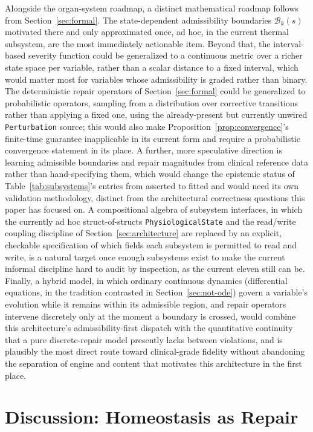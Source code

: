 \documentclass[11pt]{article}
\begin{document}
Alongside the organ-system roadmap, a distinct mathematical roadmap follows from Section~\ref{sec:formal}. The state-dependent admissibility boundaries $\mathcal B_k(s)$ motivated there and only approximated once, ad hoc, in the current thermal subsystem, are the most immediately actionable item. Beyond that, the interval-based severity function could be generalized to a continuous metric over a richer state space per variable, rather than a scalar distance to a fixed interval, which would matter most for variables whose admissibility is graded rather than binary. The deterministic repair operators of Section~\ref{sec:formal} could be generalized to probabilistic operators, sampling from a distribution over corrective transitions rather than applying a fixed one, using the already-present but currently unwired \texttt{Perturbation} source; this would also make Proposition~\ref{prop:convergence}'s finite-time guarantee inapplicable in its current form and require a probabilistic convergence statement in its place. A further, more speculative direction is learning admissible boundaries and repair magnitudes from clinical reference data rather than hand-specifying them, which would change the epistemic status of Table~\ref{tab:subsystems}'s entries from asserted to fitted and would need its own validation methodology, distinct from the architectural correctness questions this paper has focused on. A compositional algebra of subsystem interfaces, in which the currently ad hoc struct-of-structs \texttt{PhysiologicalState} and the read/write coupling discipline of Section~\ref{sec:architecture} are replaced by an explicit, checkable specification of which fields each subsystem is permitted to read and write, is a natural target once enough subsystems exist to make the current informal discipline hard to audit by inspection, as the current eleven still can be. Finally, a hybrid model, in which ordinary continuous dynamics (differential equations, in the tradition contrasted in Section~\ref{sec:not-ode}) govern a variable's evolution while it remains within its admissible region, and repair operators intervene discretely only at the moment a boundary is crossed, would combine this architecture's admissibility-first dispatch with the quantitative continuity that a pure discrete-repair model presently lacks between violations, and is plausibly the most direct route toward clinical-grade fidelity without abandoning the separation of engine and content that motivates this architecture in the first place.

\section{Discussion: Homeostasis as Repair}
\label{sec:discussion}
\end{document}
